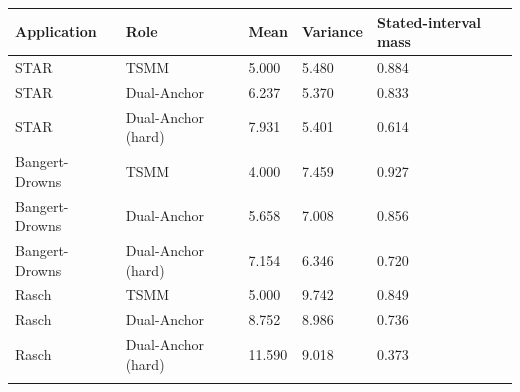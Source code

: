 \begin{longtable}{lllll}
\toprule
Application & Role & Mean & Variance & Stated-interval mass \\
\midrule\endhead
STAR & TSMM & 5.000 & 5.480 & 0.884 \\ \addlinespace[3pt]
STAR & Dual-Anchor & 6.237 & 5.370 & 0.833 \\ \addlinespace[3pt]
STAR & Dual-Anchor (hard) & 7.931 & 5.401 & 0.614 \\ \addlinespace[3pt]
Bangert-Drowns & TSMM & 4.000 & 7.459 & 0.927 \\ \addlinespace[3pt]
Bangert-Drowns & Dual-Anchor & 5.658 & 7.008 & 0.856 \\ \addlinespace[3pt]
Bangert-Drowns & Dual-Anchor (hard) & 7.154 & 6.346 & 0.720 \\ \addlinespace[3pt]
Rasch & TSMM & 5.000 & 9.742 & 0.849 \\ \addlinespace[3pt]
Rasch & Dual-Anchor & 8.752 & 8.986 & 0.736 \\ \addlinespace[3pt]
Rasch & Dual-Anchor (hard) & 11.590 & 9.018 & 0.373 \\ \addlinespace[3pt]
\bottomrule\end{longtable}
